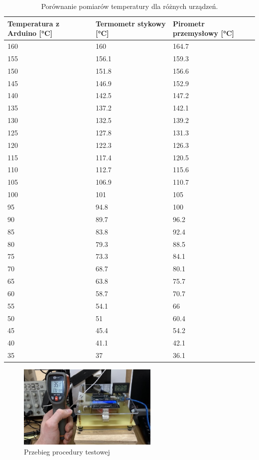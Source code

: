 \begin{table}[h!]
\centering
\begin{tabularx}{\textwidth}{|X|X|X|}
\hline
\textbf{Temperatura z Arduino [°C]} & \textbf{Termometr stykowy [°C]} & \textbf{Pirometr przemysłowy [°C]} \\
\hline
160 & 160 & 164.7 \\
\hline
155 & 156.1 & 159.3 \\
\hline
150 & 151.8 & 156.6 \\
\hline
145 & 146.9 & 152.9 \\
\hline
140 & 142.5 & 147.2 \\
\hline
135 & 137.2 & 142.1 \\
\hline
130 & 132.5 & 139.2 \\
\hline
125 & 127.8 & 131.3 \\
\hline
120 & 122.3 & 126.3 \\
\hline
115 & 117.4 & 120.5 \\
\hline
110 & 112.7 & 115.6 \\
\hline
105 & 106.9 & 110.7 \\
\hline
100 & 101 & 105 \\
\hline
95 & 94.8 & 100 \\
\hline
90 & 89.7 & 96.2 \\
\hline
85 & 83.8 & 92.4 \\
\hline
80 & 79.3 & 88.5 \\
\hline
75 & 73.3 & 84.1 \\
\hline
70 & 68.7 & 80.1 \\
\hline
65 & 63.8 & 75.7 \\
\hline
60 & 58.7 & 70.7 \\
\hline
55 & 54.1 & 66 \\
\hline
50 & 51 & 60.4 \\
\hline
45 & 45.4 & 54.2 \\
\hline
40 & 41.1 & 42.1 \\
\hline
35 & 37 & 36.1 \\
\hline
\end{tabularx}
\caption{Porównanie pomiarów temperatury dla różnych urządzeń.}
\label{tab:pomiary}
\end{table}
\begin{figure}[h!]
    \centering
    \includegraphics[width=0.6\textwidth]{images/test.jpg}
    \caption{Przebieg procedury testowej}
    \label{fig:proc}
\end{figure}